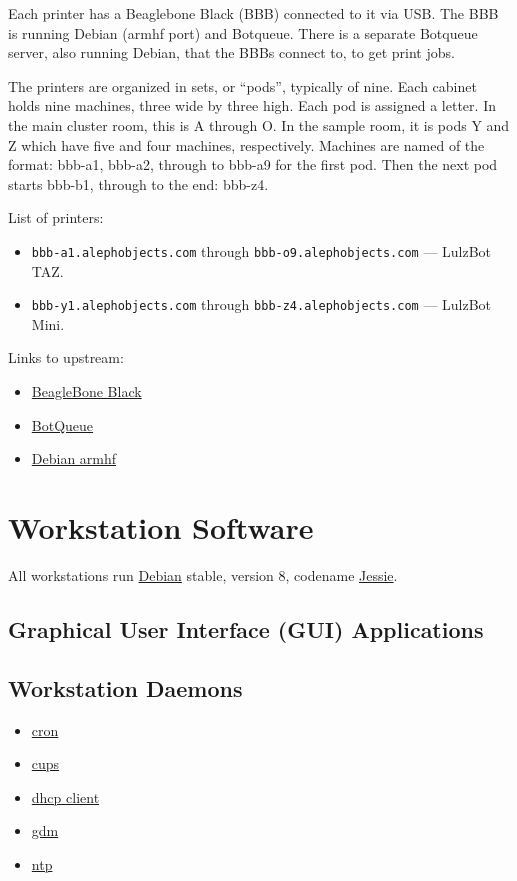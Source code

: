 Each printer has a Beaglebone Black (BBB) connected to it via USB. The
BBB is running Debian (armhf port) and Botqueue. There is a separate Botqueue
server, also running Debian, that the BBBs connect to, to get print jobs.

The printers are organized in sets, or ``pods'', typically of nine. Each cabinet
holds nine machines, three wide by three high. Each pod is assigned a letter.
In the main cluster room, this is A through O. In the sample room, it is pods
Y and Z which have five and four machines, respectively. Machines are named
of the format: bbb-a1, bbb-a2, through to bbb-a9 for the first pod. Then the
next pod starts bbb-b1, through to the end: bbb-z4.

List of printers:
\begin{itemize}
\item \texttt{bbb-a1.alephobjects.com} through
      \texttt{bbb-o9.alephobjects.com} --- LulzBot TAZ.
\item \texttt{bbb-y1.alephobjects.com} through
      \texttt{bbb-z4.alephobjects.com} --- LulzBot Mini.
\end{itemize}

Links to upstream:
\begin{itemize}
\item \href{http://beagleboard.org/}{BeagleBone Black}
\item \href{http://botqueue.org/}{BotQueue}
\item \href{https://wiki.debian.org/ArmHardFloatPort}{Debian armhf}
\end{itemize}

\section{Workstation Software}

All workstations run \href{http://www.debian.org/}{Debian} stable, version 8,
codename \href{https://www.debian.org/releases/jessie/}{Jessie}.

\subsection{Graphical User Interface (GUI) Applications}


\subsection{Workstation Daemons}
\begin{itemize}
\item \href{http://ftp.isc.org/isc/cron/}{cron}
\item \href{http://www.cups.org/}{cups}
\item \href{http://www.isc.org/}{dhcp client}
\item \href{https://wiki.gnome.org/Projects/GDM}{gdm}
\item \href{http://support.ntp.org/}{ntp}
\end{itemize}


